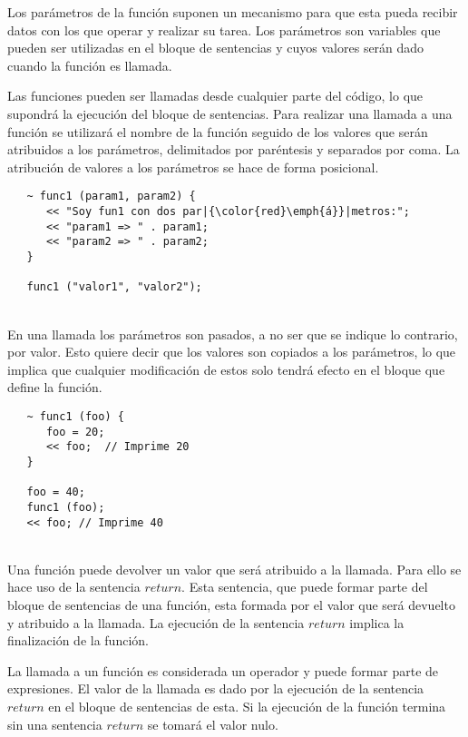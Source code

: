 Los parámetros de la función suponen un mecanismo para que esta pueda recibir datos con los que operar
y realizar su tarea. Los parámetros son variables que pueden ser utilizadas en el bloque de sentencias
y cuyos valores serán dado cuando la función es llamada.

Las funciones pueden ser llamadas desde cualquier parte del código, lo que supondrá la ejecución del bloque
de sentencias. Para realizar una llamada a una función se utilizará el nombre de la función seguido de los 
valores que serán atribuidos a los parámetros, delimitados por paréntesis y separados por coma. La atribución
de valores a los parámetros se hace de forma posicional. \\

\begin{lstlisting}
   ~ func1 (param1, param2) { 
      << "Soy fun1 con dos par|{\color{red}\emph{á}}|metros:";
      << "param1 => " . param1;
      << "param2 => " . param2;
   }
   
   func1 ("valor1", "valor2");
\end{lstlisting}
\hfill\\


En una llamada los parámetros son pasados, a no ser que se indique lo contrario, por valor. Esto quiere decir 
que los valores son copiados a los parámetros, lo que implica que cualquier modificación de estos solo tendrá efecto en el bloque 
que define la función. \\


\begin{lstlisting}
   ~ func1 (foo) { 
      foo = 20;
      << foo;  // Imprime 20
   }
   
   foo = 40;
   func1 (foo);
   << foo; // Imprime 40
\end{lstlisting}
\hfill\\


Una función puede devolver un valor que será atribuido a la llamada. Para ello 
se hace uso de la sentencia $return$. Esta sentencia, que puede formar parte del
bloque de sentencias de una función, esta formada por el valor que será devuelto 
y atribuido a la llamada. La ejecución de la sentencia $return$ implica 
la finalización de la función.

La llamada a un función es considerada un operador y puede formar parte de expresiones. El
valor de la llamada es dado por la ejecución de la sentencia $return$ en el bloque de sentencias
de esta. Si la ejecución de la función termina sin una sentencia $return$ se tomará el valor nulo. \\

